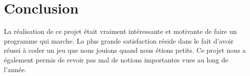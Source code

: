 \documentclass[12pt]{article}
\begin{document}
\section{Conclusion}
La réalisation de ce projet était vraiment intéressante et motivante de faire un programme qui marche. La plus grande satisfaction réside dans le fait d'avoir réussi à coder un jeu que nous jouions quand nous étions petits. Ce projet nous a également permis de revoir pas mal de notions importantes vues au long de l'année.
\end{document}
